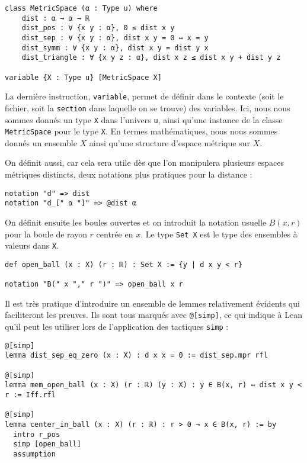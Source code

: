 \documentclass[a4paper, 12pt]{article}
\newcommand{\lean}[1]{\texttt{#1}}
\begin{document}
\begin{verbatim}
class MetricSpace (α : Type u) where
    dist : α → α → ℝ
    dist_pos : ∀ {x y : α}, 0 ≤ dist x y
    dist_sep : ∀ {x y : α}, dist x y = 0 ↔ x = y
    dist_symm : ∀ {x y : α}, dist x y = dist y x
    dist_triangle : ∀ {x y z : α}, dist x z ≤ dist x y + dist y z

variable {X : Type u} [MetricSpace X]
\end{verbatim}

La dernière instruction, \lean{variable}, permet de définir dans le contexte (soit le fichier, soit la \lean{section} dans laquelle on se trouve) des variables. Ici, nous nous sommes donnés un type \lean{X} dans l'univers \lean{u}, ainsi qu'une instance de la classe \lean{MetricSpace} pour le type \lean{X}. En termes mathématiques, nous nous sommes donnés un ensemble $X$ ainsi qu'une structure d'espace métrique sur $X$.

On définit aussi, car cela sera utile dès que l'on manipulera plusieurs espaces métriques distincts, deux notations plus pratiques pour la distance :

\begin{verbatim}
notation "d" => dist
notation "d_[" α "]" => @dist α
\end{verbatim}

On définit ensuite les boules ouvertes et on introduit la notation usuelle $B(x, r)$ pour la boule de rayon $r$ centrée en $x$. Le type \lean{Set X} est le type des ensembles à valeurs dans \lean{X}.

\begin{verbatim}
def open_ball (x : X) (r : ℝ) : Set X := {y | d x y < r}

notation "B(" x "," r ")" => open_ball x r
\end{verbatim}

Il est très pratique d'introduire un ensemble de lemmes relativement évidents qui faciliteront les preuves. Ils sont tous marqués avec \lean{@[simp]}, ce qui indique à Lean qu'il peut les utiliser lors de l'application des tactiques \lean{simp} :

\begin{verbatim}
@[simp]
lemma dist_sep_eq_zero (x : X) : d x x = 0 := dist_sep.mpr rfl

@[simp]
lemma mem_open_ball (x : X) (r : ℝ) (y : X) : y ∈ B(x, r) ↔ dist x y < r := Iff.rfl

@[simp]
lemma center_in_ball (x : X) (r : ℝ) : r > 0 → x ∈ B(x, r) := by
  intro r_pos
  simp [open_ball]
  assumption
\end{verbatim}
\end{document}
